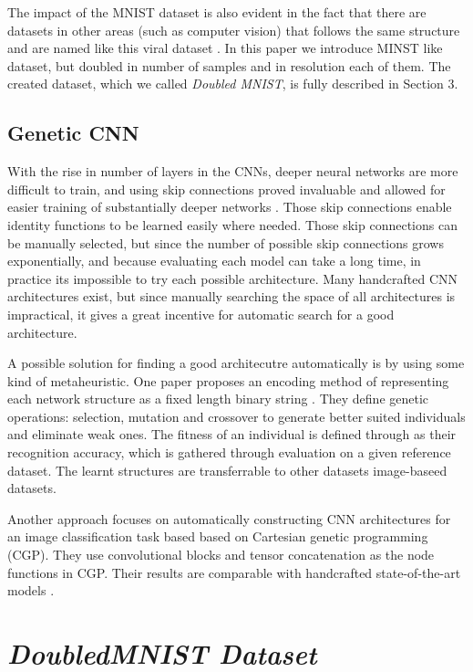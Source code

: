 \documentclass[eng]{simposium}
\begin{document}
The impact of the MNIST dataset is also evident in the fact that there are datasets in other areas (such as computer vision) that
follows the same structure and are named like this viral dataset \cite{27}. 
In this paper we introduce MINST like dataset, but doubled in number of samples and in resolution each of them. 
The created dataset, which we called \textit{Doubled MNIST}, is fully described in Section 3. 

\subsection{Genetic CNN}

With the rise in number of layers in the CNNs, deeper neural networks are more difficult to train, and using skip connections proved invaluable and allowed 
for easier training of substantially deeper networks \cite{6}. Those skip connections enable identity functions to be learned easily where needed.
Those skip connections can be manually selected, but since the number of possible skip connections grows exponentially, and because evaluating each model can take a long time, 
in practice its impossible to try each possible architecture.
Many handcrafted CNN architectures exist, but since manually searching the space of all architectures is impractical, it gives a great incentive for automatic search 
for a good architecture.

A possible solution for finding a good architecutre automatically is by using some kind of metaheuristic. 
One paper proposes an encoding method of representing each network structure as a fixed length binary string \cite{4}. 
They define genetic operations: selection, mutation and crossover to generate better suited individuals and eliminate weak ones.
The fitness of an individual is defined through as their recognition accuracy, which is gathered through evaluation on a given reference dataset.
The learnt structures are transferrable to other datasets image-baseed datasets.

Another approach focuses on automatically constructing CNN architectures for an image classification task based based on Cartesian genetic programming (CGP).
They use convolutional blocks and tensor concatenation as the node functions in CGP. Their results are comparable with handcrafted state-of-the-art models \cite{5}.

\section{\textit{DoubledMNIST Dataset}}
\end{document}
